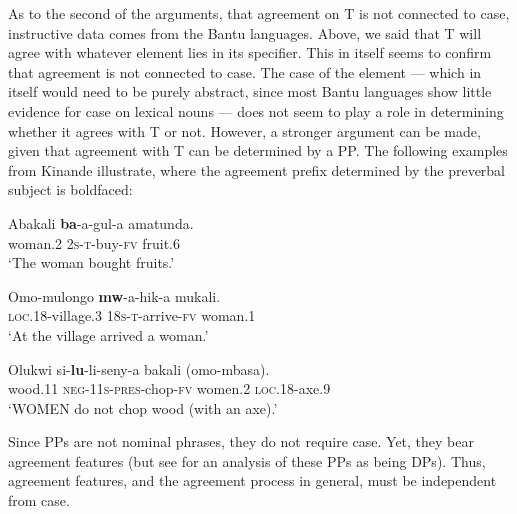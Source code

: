 \documentclass[output=paper
,modfonts
,nonflat]{langsci/langscibook}
\begin{document}
As to the second of the arguments, that agreement on T is not connected to case, instructive data comes from the Bantu languages.
Above, we said that T will agree with whatever element lies in its specifier.
This in itself seems to confirm that agreement is not connected to case. The case of the element --- which in itself would need to be purely abstract, since most Bantu languages show little evidence for case on lexical nouns --- does not seem to play a role in determining whether it agrees with T or not.
However, a stronger argument can be made, given that agreement with T can be determined by a PP.
The following examples from Kinande illustrate, where the agreement prefix determined by the preverbal subject is boldfaced:
\begin{exe}
	\ex 
	\begin{xlist}
		\ex
		\gll Abakali \textbf{ba}-a-gul-a amatunda.\\
		woman.\textsc{2} \textsc{2s-t}-buy-\textsc{fv} fruit.\textsc{6}\\
		\glt `The woman bought fruits.'
		
		\ex 
		\gll Omo-mulongo \textbf{mw}-a-hik-a mukali.\\
		\textsc{loc.18}-village.\textsc{3} \textsc{18s-t}-arrive-\textsc{fv} woman.\textsc{1}\\
		\glt `At the village arrived a woman.'
		
		\ex 
		\gll Olukwi si-\textbf{lu}-li-seny-a bakali (omo-mbasa).\\
		wood.\textsc{11} \textsc{neg-11s-pres}-chop-\textsc{fv} women.\textsc{2} \textsc{loc.18}-axe.\textsc{9}\\
		\glt `WOMEN do not chop wood (with an axe).'
		
	\end{xlist}
\end{exe}
Since PPs are not nominal phrases, they do not require case.
Yet, they bear agreement features (but see \citealt{Carstens1997} for an analysis of these PPs as being DPs). Thus, agreement features, and the agreement process in general, must be independent from case.
\end{document}
